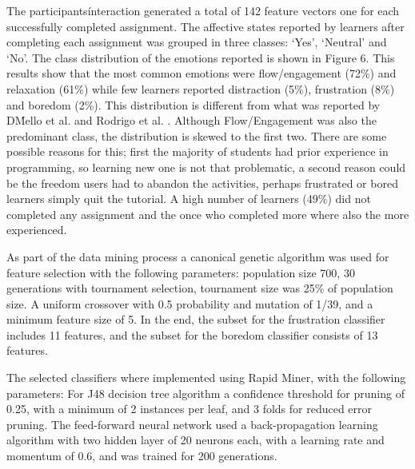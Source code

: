\documentclass[a4paper,twoside]{article}
\begin{document}
The participants\' interaction generated a total of 142 feature vectors one for each
successfully completed assignment. The affective states reported by learners after
completing each assignment was grouped in three classes: ‘Yes’, ‘Neutral’ and
‘No’. The class distribution of the emotions reported is shown in Figure 6. This
results show that the most common emotions were flow/engagement (72\%) and
relaxation (61\%) while few learners reported distraction (5\%), frustration
(8\%) and boredom (2\%). This distribution is different from what was reported
by D\'Mello et al. \cite{bixler2013detecting} and Rodrigo et al. \cite{rodrigo2009affective}.
Although Flow/Engagement was
also the predominant class, the distribution is skewed to the first two. There
are some possible reasons for this; first the majority of students had
prior experience in programming, so learning new one is not that problematic, a second
reason could be the freedom users had to abandon the activities, perhaps
frustrated or bored learners simply quit the tutorial. A high number of learners
(49\%) did not completed any assignment and the once who completed more where also
the more experienced.

As part of the data mining process a canonical genetic algorithm was used for feature
selection with the following parameters: population size 700, 30 generations with
tournament selection, tournament size was 25\% of population size. A uniform crossover 
with 0.5 probability and mutation of 1/39, and a minimum feature size of 5.
In the end, the subset for the frustration classifier includes 11 features, and the subset for the boredom classifier consists of
13 features.

The selected classifiers where implemented using Rapid Miner, with the following parameters:
For J48 decision tree algorithm a confidence threshold for pruning of 0.25, with a
minimum of 2 instances per leaf, and 3 folds for reduced error pruning. The feed-forward 
neural network used a back-propagation learning algorithm with two hidden layer of 20 neurons
each, with a learning rate and momentum of 0.6, and was trained for 200 generations.
\end{document}
